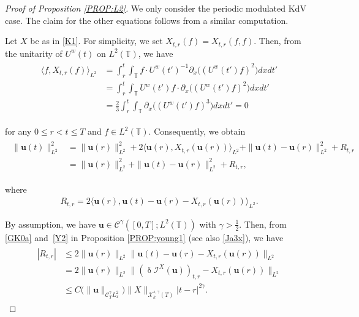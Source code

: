 \documentclass[letterpaper, 11pt,  reqno]{amsart}
\newcommand{\1}{\hspace{0.5mm}\text{I}\hspace{0.5mm}}
\newcommand{\I}{\mathcal{I}}
\newcommand{\noi}{\noindent}
\newcommand{\T}{\mathbb{T}}
\newcommand{\CC}{\mathcal{C}}
\newcommand{\updl}{\updelta}
\newcommand{\g}{\gamma}
\newcommand{\dx}{\partial_x}
\newcommand{\jb}[1]
{\langle #1 \rangle}
\newcommand{\cX}{\mathcal{X}}
\newcommand{\uw}{U^w}
\newcommand{\uu}{\mathbf{u}}
\numberwithin{equation}{section}
\numberwithin{theorem}{section}
\begin{document}
\begin{proof}[Proof of Proposition \ref{PROP:L2}]

We only consider the periodic modulated KdV case.
The claim for the other equations follows 
from a similar computation.


Let $X$ be as in 
\eqref{K1}.
For simplicity, we set $X_{t, r}(f) = X_{t, r}(f, f)$.
Then, 
from the unitarity of $\uw(t)$ on $L^2(\T)$, 
we have 
\begin{align}
\begin{split}
\jb{f, X_{t,r}(f)  }_{L^2}
&=\int_{r}^{t} 
\int_{\T}  f\cdot 
 \uw(t')^{-1}  
\dx \big((\uw(t') f)^2 \big) 
dx  dt'\\
&=\int_{r}^{t}
 \int_{\T}   \uw(t')  f \cdot 
  \dx \big((\uw(t') f)^2\big)   dxdt'
\\&=\frac 23 \int_{r}^{t} \int_{\T}
  \dx \big((\uw(t') f)^3\big)
   dx dt'=0
\end{split}
\label{GK0}
\end{align}


\noi
for any  $0\leq r<t\leq T$ and $f \in L^2(\T)$.
Consequently,
we obtain 
\begin{align}
\label{GK1}
\begin{aligned}
\| \uu(t) \|^2_{L^2}
&=\|  \uu(r)  \|_{L^2}^2
+2\big\langle \uu(r),X_{t,r}(\uu(r)) 
\big\rangle_{L^2}
 +  \|  \uu(t) -\uu(r)  \|^2_{L^2}+R_{t,r}\\
&=\|  \uu(r)  \|^2_{L^2} +
\|   \uu(t)-\uu(r)   \|^2_{L^2}
+R_{t,r},
\end{aligned}
\end{align}



\noi
where 
\begin{align*}
R_{t,r}=2\big\langle 
\uu(r) ,  \uu(t)-  \uu(r) -X_{t,r}(\uu(r))\big\rangle_{L^2}. 
\end{align*}


\noi
By assumption, we have 
 $\uu\in \CC^\g([0, T];  L^2(\T))$
with $\g>\frac 12$. 
Then, 
from \eqref{GK0a} and~\eqref{Y2} in Proposition \ref{PROP:young1}
(see also \eqref{Ja3x}), 
we have 
\begin{align}
\begin{split}
|R_{t,r}| 
&\leq 2 
\|\uu(r)\|_{L^2}
\|\uu(t)- \uu(r) -X_{t,r}(\uu(r))\|_{L^2}
\\
&= 2
\|\uu(r)\|_{L^2}
\|(\updl\I^X(\uu))_{t, r}  -X_{t,r}(\uu(r))\|_{L^2}
\\
&\le
C\big(\|\uu\|_{\CC^\g_{T} L^2_x}\big)  \|X\|_{\cX^{s, \g}_k(T)} |t-r|^{2\g}.
\end{split}
\label{GK2}
\end{align}




\end{proof}
\end{document}
